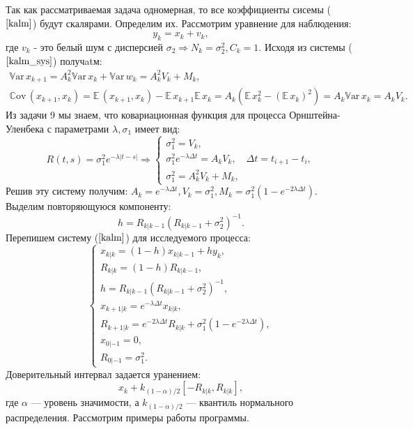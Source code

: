 \documentclass[oneside, final, 12pt]{article}
\def\Var{{\mathbb{V}\textrm{ar}}\,}
\def\E{{\mathbb{E} }\,}
\def\Cov{{\mathbb{C}\textrm{ov}}\,}
\begin{document}
	Так как рассматриваемая задача одномерная, то все коэффициенты сисемы ($\ref{kalm}$) будут скалярами.
	Определим их. Рассмотрим уравнение для наблюдения:
	$$y_{k} = x_{k} + v_k,$$
	где $v_k$ - это белый шум с дисперсией $\sigma_2 \Rightarrow N_k = \sigma_2^2, C_k =1.$
	Исходя из системы ($\ref{kalm_sys}$) получatм: 
	$$
		\begin{gathered}
			\Var x_{k+1} = A_k^2\Var x_k + \Var w_k = A_k^2V_k+ M_k, \\
			\Cov (x_{k+1},x_k) = \E (x_{k+1},x_k) - \E x_{k+1}\E x_{k} = A_k (\E x_k^2 - (\E x_k)^2)
			= A_k\Var x_k = A_kV_k.
		\end{gathered}
	$$
	Из задачи 9 мы знаем, что ковариационная функция для процесса Орнштейна-Уленбека
	 с параметрами $\lambda, \sigma_1$
	имеет вид:
	$$
		R(t,s) = \sigma_1^2e^{-\lambda|t-s|} \Rightarrow
			\begin{cases}
				\sigma_1^2 = V_k, \\
				\sigma_1^2e^{-\lambda\Delta t} = A_k V_k, \quad \Delta t = t_{i+1}-t_i, \\ 
				\sigma_1^2 = A_k^2V_k+ M_k,
			\end{cases}
	$$
 	Решив эту систему получим: $A_k=e^{-\lambda\Delta t}, 
 			V_k = \sigma_1^2, M_k =  \sigma_1^2(1-e^{-2\lambda\Delta t}). $
 	\newline
	Выделим повторяющуюся компоненту:
	$$
		h =  R_{k|k-1}(R_{k|k-1} + \sigma_2^2)^{-1}. 
	$$
	Перепишем систему ($\ref{kalm}$) для исследуемого процесса:
	\begin{equation}
		\begin{cases}		
			x_{k|k}  = (1-h) x_{k|k-1} + h y_k, \\
			R_{k|k} = (1- h) R_{k|k-1}, \\
			h =  R_{k|k-1}(R_{k|k-1} + \sigma_2^2)^{-1}, \\
			x_{k+1|k} = e^{-\lambda\Delta t} x_{k|k}, \\
			R_{k+1|k} = e^{-2\lambda\Delta t} R_{k|k} + \sigma_1^2(1-e^{-2\lambda\Delta t}),\\
			x_{0|-1} = 0,\\ 
			R_{0|-1} = \sigma_1^2.
		\end{cases} \label{kalm}
	\end{equation}
	Доверительный интервал задается уранением: $$x_k +k_{(1-\alpha)\slash 2}[-R_{k|k},R_{k|k}],$$ 
	где $\alpha$ --- уровень значимости, а $k_{(1-\alpha)\slash 2}$ --- квантиль нормального распределения.
\newpage
	Рассмотрим примеры работы программы.
\end{document}
